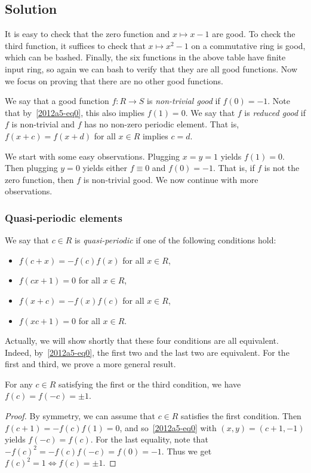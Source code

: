\subsection*{Solution}

It is easy to check that the zero function and $x \mapsto x - 1$ are good.
To check the third function, it suffices to check that $x \mapsto x^2 - 1$ on a commutative ring is good, which can be bashed.
Finally, the six functions in the above table have finite input ring, so again we can bash to verify that they are all good functions.
Now we focus on proving that there are no other good functions.

We say that a good function $f : R \to S$ is \emph{non-trivial good} if $f(0) = -1$.
Note that by~\eqref{2012a5-eq0}, this also implies $f(1) = 0$.
We say that $f$ is \emph{reduced good} if $f$ is non-trivial and $f$ has no non-zero periodic element.
That is, $f(x + c) = f(x + d)$ for all $x \in R$ implies $c = d$.

We start with some easy observations.
Plugging $x = y = 1$ yields $f(1) = 0$.
Then plugging $y = 0$ yields either $f \equiv 0$ and $f(0) = -1$.
That is, if $f$ is not the zero function, then $f$ is non-trivial good.
We now continue with more observations.



\subsubsection*{Quasi-periodic elements}

We say that $c \in R$ is \emph{quasi-periodic} if one of the following conditions hold:
\begin{itemize}
    \item   $f(c + x) = -f(c) f(x)$ for all $x \in R$,
    \item   $f(cx + 1) = 0$ for all $x \in R$,
    \item   $f(x + c) = -f(x) f(c)$ for all $x \in R$,
    \item   $f(xc + 1) = 0$ for all $x \in R$.
\end{itemize}

Actually, we will show shortly that these four conditions are all equivalent.
Indeed, by~\eqref{2012a5-eq0}, the first two and the last two are equivalent.
For the first and third, we prove a more general result.

\begin{claim}
For any $c \in R$ satisfying the first or the third condition, we have $f(c) = f(-c) = \pm 1$.
\end{claim}
\begin{proof}
By symmetry, we can assume that $c \in R$ satisfies the first condition.
Then $f(c + 1) = -f(c) f(1) = 0$, and so~\eqref{2012a5-eq0} with $(x, y) = (c + 1, -1)$ yields $f(-c) = f(c)$.
For the last equality, note that $-f(c)^2 = -f(c) f(-c) = f(0) = -1$.
Thus we get $f(c)^2 = 1 \iff f(c) = \pm 1$.
\end{proof}

